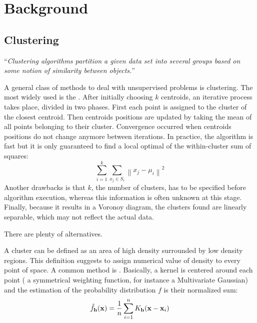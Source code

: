 \chapter{Background}
\label{ch:background}

\section{Clustering}

\enquote{\emph{Clustering algorithms partition a given data set into several
groups based on some notion of similarity between objects.}}

A general class of methods to deal with unsupervised problems is clustering.
The most widely used is the 
\autocite{kmeans67}. After initially choosing $k$ centroids, an iterative
process takes place, divided in two phases. First each point is assigned to
the cluster of the closest centroid. Then centroids positions are updated by
taking the mean of all points belonging to their cluster. Convergence occurred
when centroids positions do not change anymore between iterations. In
practice, the algorithm is fast but it is only guaranteed to find a local
optimal of the within-cluster sum of squares: \[ \sum_{i=1}^{k} \sum_{ x_j \in
S_i} \left\| x_j - \mu_i \right\|^2 \] Another drawbacks is that $k$, the
number of clusters, has to be specified before algorithm execution, whereas
this information is often unknown at this stage. Finally, because it results
in a Voronoy diagram, the clusters found are linearly separable, which may not
reflect the actual data.

There are plenty of alternatives.

A cluster can be defined as an area of high density surrounded by low density
regions. This definition suggests to assign numerical value of density to
every point of space. A common method is 
 \autocite{KDE56}. Basically, a kernel
is centered around each point (\ie{} a symmetrical weighting function, for
instance a Multivariate Gaussian) and the estimation of the probability
distribution $f$ is their normalized sum:
\[ \hat{f}_\bold{h}(\bold{x})= \frac{1}{n} \sum_{i=1}^n K_\bold{h} (\bold{x} -
\bold{x}_i) \]


